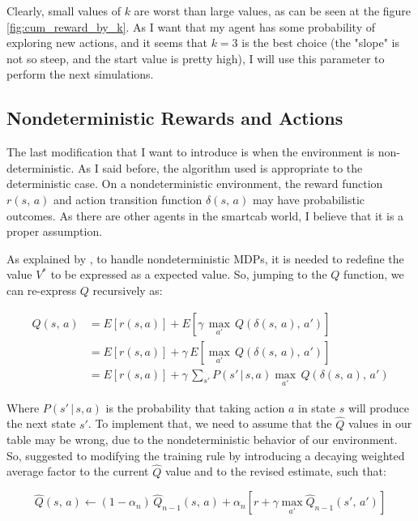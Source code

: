 \documentclass[a4paper]{article}
\begin{document}
Clearly, small values of $k$ are worst than large values, as can be seen at the figure \ref{fig:cum_reward_by_k}. As I want that my agent has some probability of exploring new actions, and it seems that $k=3$ is the best choice (the "slope" is not so steep, and the start value is pretty high), I will use this parameter to perform the next simulations.

\subsection{Nondeterministic Rewards and Actions}
The last modification that I want to introduce is when the environment is non-deterministic. As I said before, the algorithm used is appropriate to the deterministic case. On a nondeterministic environment, the reward function $r(s,\,a)$ and action transition function $\delta(s,\,a)$ may have probabilistic outcomes. As there are other agents in the smartcab world, I believe that it is a proper assumption.

As explained by \cite{Mitchell}, to handle nondeterministic MDPs, it is needed to redefine the value $V^{*}$ to be expressed as a expected value. So, jumping to the $Q$ function, we can re-express $Q$ recursively as:

\begin{equation}
\begin{aligned}
Q(s, \, a) &= E \left [r(s, a) \right ] + E \left [\gamma \, \underset{a'}{\max} \, Q(\delta(s,\, a), \, a')\right ]\\
&= E \left [r(s, a) \right ] + \gamma \,  E \left [\underset{a'}{\max} \, Q(\delta(s,\, a), \, a')\right ]\\
&= E \left [r(s, a) \right ] + \gamma \,  \sum_{s'} P\left(s' \,| \,s, a   \right) \underset{a'}{\max} \, Q(\delta(s,\, a), \, a')
\end{aligned}
\end{equation}

Where $P\left(s' \,| \,s, a   \right)$ is the probability that taking action $a$ in state $s$ will produce the next state $s'$. To implement that, we need to assume that the $\hat{Q}$ values in our table may be wrong, due to the nondeterministic behavior of our environment. So, \cite{Mitchell} suggested to modifying the training rule by introducing a decaying weighted average factor to the current $\hat{Q}$ value and to the revised estimate, such that:

$$\hat{Q}(s, \, a) \leftarrow  (1 - \alpha_{n})\, \hat{Q}_{n-1}(s, \, a) +  \alpha_{n}\left[ r + \gamma \underset{a'}{\max} \hat{Q}_{n-1}(s', \, a') \right ]$$
\end{document}
